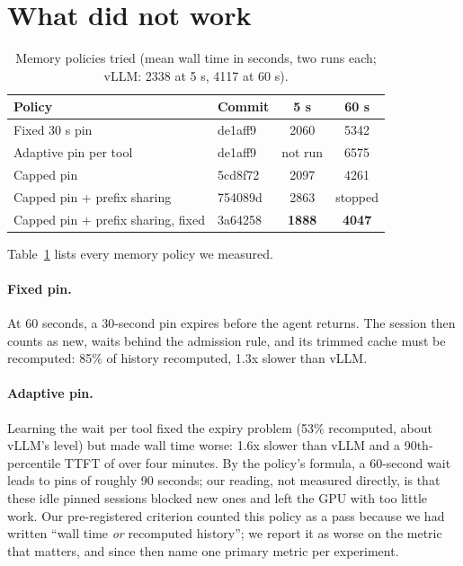 \documentclass[11pt]{article}
\begin{document}
\section{What did not work}
\label{sec:negative}

\begin{table}[t]
\centering
\caption{Memory policies tried (mean wall time in seconds, two runs each; vLLM: 2338 at 5 s, 4117 at 60 s).}
\label{tab:negative}
\begin{tabular}{llcc}
\toprule
Policy & Commit & 5 s & 60 s \\
\midrule
Fixed 30 s pin & de1aff9 & 2060 & 5342 \\
Adaptive pin per tool & de1aff9 & not run & 6575 \\
Capped pin & 5cd8f72 & 2097 & 4261 \\
Capped pin + prefix sharing & 754089d & 2863 & stopped \\
Capped pin + prefix sharing, fixed & 3a64258 & \textbf{1888} & \textbf{4047} \\
\bottomrule
\end{tabular}
\end{table}

Table~\ref{tab:negative} lists every memory policy we measured.

\paragraph{Fixed pin.} At 60 seconds, a 30-second pin expires before the agent returns. The session then counts as new, waits behind the admission rule, and its trimmed cache must be recomputed: 85\% of history recomputed, 1.3x slower than vLLM.

\paragraph{Adaptive pin.} Learning the wait per tool fixed the expiry problem (53\% recomputed, about vLLM's level) but made wall time worse: 1.6x slower than vLLM and a 90th-percentile TTFT of over four minutes. By the policy's formula, a 60-second wait leads to pins of roughly 90 seconds; our reading, not measured directly, is that these idle pinned sessions blocked new ones and left the GPU with too little work. Our pre-registered criterion counted this policy as a pass because we had written ``wall time \emph{or} recomputed history''; we report it as worse on the metric that matters, and since then name one primary metric per experiment.
\end{document}
